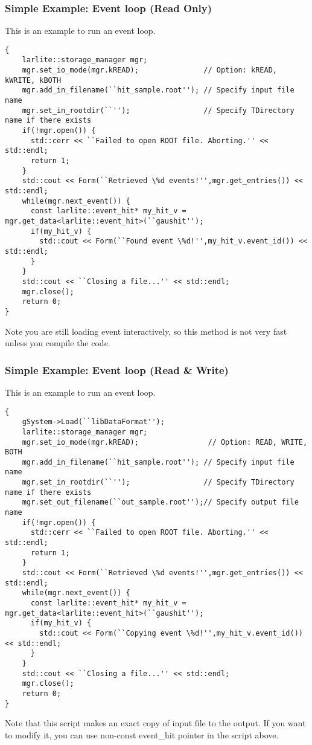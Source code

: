 \subsubsection{Simple Example: Event loop (Read Only)}
This is an example to run an event loop.
\begin{lstlisting}
{
    larlite::storage_manager mgr;
    mgr.set_io_mode(mgr.kREAD);               // Option: kREAD, kWRITE, kBOTH
    mgr.add_in_filename(``hit_sample.root''); // Specify input file name
    mgr.set_in_rootdir(``'');                 // Specify TDirectory name if there exists
    if(!mgr.open()) {
      std::cerr << ``Failed to open ROOT file. Aborting.'' << std::endl;
      return 1;
    }
    std::cout << Form(``Retrieved \%d events!'',mgr.get_entries()) << std::endl;
    while(mgr.next_event()) {
      const larlite::event_hit* my_hit_v = mgr.get_data<larlite::event_hit>(``gaushit'');
      if(my_hit_v) {
        std::cout << Form(``Found event \%d!'',my_hit_v.event_id()) << std::endl;
      }
    }
    std::cout << ``Closing a file...'' << std::endl;
    mgr.close();
    return 0;
}
\end{lstlisting}
Note you are still loading event interactively, so this method is not very fast unless you compile the code.

\subsubsection{Simple Example: Event loop (Read \& Write)}
This is an example to run an event loop.
\begin{lstlisting}
{
    gSystem->Load(``libDataFormat'');
    larlite::storage_manager mgr;
    mgr.set_io_mode(mgr.kREAD);                // Option: READ, WRITE, BOTH
    mgr.add_in_filename(``hit_sample.root''); // Specify input file name
    mgr.set_in_rootdir(``'');                 // Specify TDirectory name if there exists
    mgr.set_out_filename(``out_sample.root'');// Specify output file name
    if(!mgr.open()) {
      std::cerr << ``Failed to open ROOT file. Aborting.'' << std::endl;
      return 1;
    }
    std::cout << Form(``Retrieved \%d events!'',mgr.get_entries()) << std::endl;
    while(mgr.next_event()) {
      const larlite::event_hit* my_hit_v = mgr.get_data<larlite::event_hit>(``gaushit'');
      if(my_hit_v) {
        std::cout << Form(``Copying event \%d!'',my_hit_v.event_id()) << std::endl;
      }
    }
    std::cout << ``Closing a file...'' << std::endl;
    mgr.close();
    return 0;
}
\end{lstlisting}
Note that this script makes an exact copy of input file to the output.
If you want to modify it, you can use non-const {\ttfamily event\_hit} pointer in the script above.






